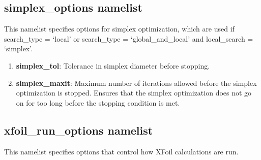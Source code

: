 \documentclass[11pt]{article}
\begin{document}
\subsection{simplex\_options namelist}

This namelist specifies options for simplex optimization, which are used if
search\_type = `local' or search\_type = `global\_and\_local' and local\_search =
`simplex'.

\begin{enumerate}
\item{\textbf{simplex\_tol}: Tolerance in simplex diameter before stopping.}
\item{\textbf{simplex\_maxit}: Maximum number of iterations allowed before the simplex
optimization is stopped.  Ensures that the simplex optimization does not go on for
too long before the stopping condition is met.}
\end{enumerate}

\subsection{xfoil\_run\_options namelist}

This namelist specifies options that control how XFoil calculations are run.
\end{document}
